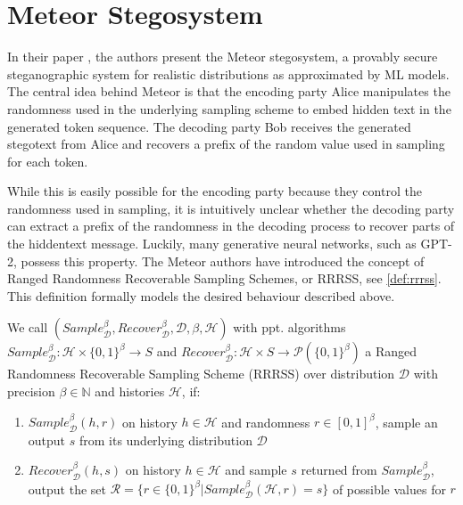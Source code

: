 


\section{Meteor Stegosystem}
\label{sec:meteor}
In their paper \cite{Meteor2021}, the authors present the Meteor stegosystem, a provably secure steganographic system for realistic distributions as approximated by ML models.
The central idea behind Meteor is that the encoding party Alice manipulates the randomness used in the underlying sampling scheme to embed hidden text in the generated token sequence.
The decoding party Bob receives the generated stegotext from Alice and recovers a prefix of the random value used in sampling for each token.

While this is easily possible for the encoding party because they control the randomness used in sampling, it is intuitively unclear whether the decoding party can extract a prefix of the randomness in the decoding process to recover parts of the hiddentext message.
Luckily, many generative neural networks, such as GPT-2, possess this property.
The Meteor authors have introduced the concept of Ranged Randomness Recoverable Sampling Schemes, or RRRSS, see \autoref{def:rrrss}.
This definition formally models the desired behaviour described above.

\begin{definition}
	\label{def:rrrss}
	We call 
	$(Sample_{\mathcal{D}}^\beta, Recover_{\mathcal{D}}^\beta, \mathcal{D}, \beta, \mathcal{H})$ 
	with ppt. algorithms
	$Sample_{\mathcal{D}}^\beta \colon \mathcal{H} \times \{0,1\}^\beta \rightarrow S$ 
	and 
	$Recover_{\mathcal{D}}^\beta \colon \mathcal{H} \times S \rightarrow \mathcal{P}(\{0,1\}^\beta)$ 
	a Ranged Randomness Recoverable Sampling Scheme (RRRSS) over distribution $\mathcal{D}$ with precision $\beta \in \mathbb{N}$ and histories $\mathcal{H}$, if:
	
	\begin{enumerate}
		\item $Sample_{\mathcal{D}}^\beta(h, r)$ on history $h \in \mathcal{H}$ and randomness $r \in [0,1]^\beta$, sample an output $s$ from its underlying distribution $\mathcal{D}$
		\item $Recover_{\mathcal{D}}^\beta(h, s)$ on history $h \in \mathcal{H}$ and sample $s$ returned from $Sample_{\mathcal{D}}^\beta$, output the set $\mathcal{R} = \{ r \in \{0,1\}^\beta | Sample_{\mathcal{D}}^\beta(\mathcal{H}, r) = s \}$ of possible values for $r$
	\end{enumerate}
\end{definition}

